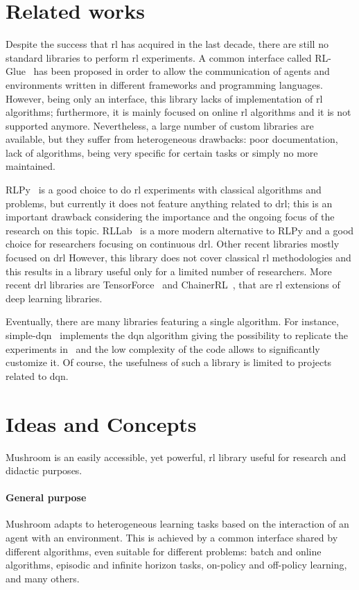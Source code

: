 \section{Related works}
Despite the success that \gls{rl} has acquired in the last decade, there are still no standard libraries to perform \gls{rl} experiments. A common interface called RL-Glue~\cite{tanner2009rl} has been proposed in order to allow the communication of agents and environments written in different frameworks and programming languages. However, being only an interface, this library lacks of implementation of \gls{rl} algorithms; furthermore, it is mainly focused on online \gls{rl} algorithms and it is not supported anymore. Nevertheless, a large number of custom libraries are available, but they suffer from heterogeneous drawbacks: poor documentation, lack of algorithms, being very specific for certain tasks or simply no more maintained.

RLPy~\cite{JMLR:v16:geramifard15a} is a good choice to do \gls{rl} experiments with classical algorithms and problems, but currently it does not feature anything related to \gls{drl}; this is an important drawback considering the importance and the ongoing focus of the research on this topic. RLLab~\cite{duan2016benchmarking} is a more modern alternative to RLPy and a good choice for researchers focusing on continuous \gls{drl}. Other recent libraries mostly focused on \gls{drl} However, this library does not cover classical \gls{rl} methodologies and this results in a library useful only for a limited number of researchers. More recent \gls{drl} libraries are TensorForce~\cite{schaarschmidt2017tensorforce} and ChainerRL~\cite{bworld}, that are \gls{rl} extensions of deep learning libraries.

Eventually, there are many libraries featuring a single algorithm. For instance, simple-dqn~\cite{simpledqn} implements the \gls{dqn} algorithm giving the possibility to replicate the experiments in~\cite{mnih2015human} and the low complexity of the code allows to significantly customize it. Of course, the usefulness of such a library is limited to projects related to \gls{dqn}.

\section{Ideas and Concepts}
Mushroom is an easily accessible, yet powerful, \gls{rl} library useful for research and didactic purposes.
\paragraph{General purpose} Mushroom adapts to heterogeneous learning tasks based on the interaction of an agent with an environment. This is achieved by a common interface shared by different algorithms, even suitable for different problems: batch and online algorithms, episodic and infinite horizon tasks, on-policy and off-policy learning, and many others.
